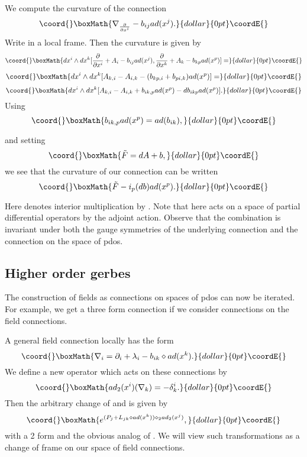 \documentclass[a4paper,11pt]{amsart}
\begin{document}
   
We compute the curvature of the connection 
$$\coord{}\boxMath{\nabla_{\frac{\partial}{\partial x^i}} - b_{ij}ad(x^j).}{dollar}{0pt}\coordE{}$$
Write \coordHE{} in a local frame. Then the curvature is given by 
 $$\coord{}\boxMath{dx^i\wedge dx^k[\frac{\partial}{\partial x^i} + A_i - b_{ij}ad(x^j),
\frac{\partial}{\partial x^k} + A_k - b_{kp}ad(x^p)] = }{dollar}{0pt}\coordE{}$$  $$\coord{}\boxMath{dx^i\wedge dx^k[A_{k,i} - A_{i,k} - (b_{kp,i}+ b_{pi,k})ad(x^p)] =}{dollar}{0pt}\coordE{}$$  $$\coord{}\boxMath{dx^i\wedge dx^k[A_{k,i} - A_{i,k} + b_{ik,p}ad(x^p) - db_{ikp}ad(x^p)].}{dollar}{0pt}\coordE{}$$ 
Using 
$$\coord{}\boxMath{b_{ik,p}ad(x^p) = ad(b_{ik}),}{dollar}{0pt}\coordE{}$$

and setting 
$$\coord{}\boxMath{\tilde F = dA + b,}{dollar}{0pt}\coordE{}$$
we see that the curvature of our connection can be written 
$$\coord{}\boxMath{\tilde F - i_p(db)ad(x^p).}{dollar}{0pt}\coordE{}$$   

Here \coordHE{} denotes interior multiplication by \coordHE{}. 
Note that here \coordHE{} acts on a space of partial differential operators by 
the adjoint action. Observe that the combination \coordHE{} is
invariant under both the gauge symmetries of the underlying connection and the
connection on the space of pdos. 


\subsection{Higher order gerbes}\label{failsC}
The construction of \coordHE{} fields as connections on spaces of 
pdos can now be iterated. For example, we get a three form connection 
if we consider connections on the \coordHE{} field connections. 

A general \coordHE{} field connection locally has the form 
$$\coord{}\boxMath{\nabla_i = \partial_i + \lambda_i - b_{ik}\diamond ad(x^k).}{dollar}{0pt}\coordE{}$$
We define a new \coordHE{} operator \coordHE{} which acts on these connections by 
$$\coord{}\boxMath{ad_2(x^i)(\nabla_k) = -\delta^i_k.}{dollar}{0pt}\coordE{}$$
Then the arbitrary change of \coordHE{} and \coordHE{} is given by 
$$\coord{}\boxMath{e^{(P_j + L_{jk}\diamond ad(x^k))\diamond_2ad_2(x^j)},}{dollar}{0pt}\coordE{}$$
with \coordHE{} a 2 form and \coordHE{} the obvious analog of \myHighlight{$\diamond$}\coordHE{}. 
We will view such transformations as a change of frame on our space of \coordHE{} field
connections. 
\end{document}
